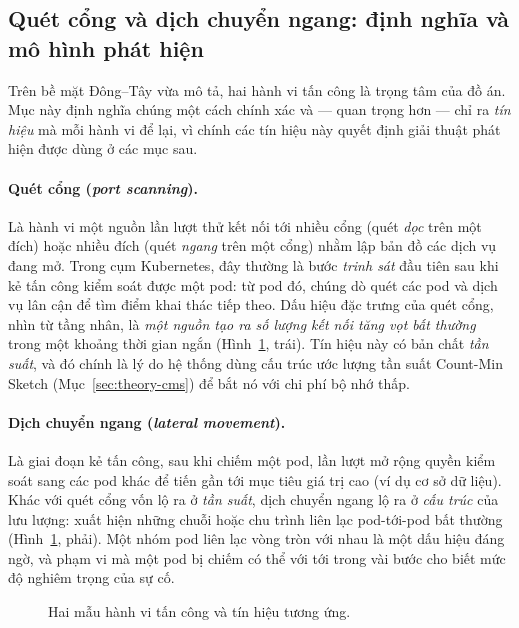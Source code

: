\subsection{Quét cổng và dịch chuyển ngang: định nghĩa và mô hình phát hiện}
\label{subsec:threat-defs}

Trên bề mặt Đông--Tây vừa mô tả, hai hành vi tấn công là trọng tâm của đồ án. Mục này
định nghĩa chúng một cách chính xác và --- quan trọng hơn --- chỉ ra \emph{tín hiệu} mà
mỗi hành vi để lại, vì chính các tín hiệu này quyết định giải thuật phát hiện được dùng ở
các mục sau.

\paragraph{Quét cổng (\textit{port scanning}).} Là hành vi một nguồn lần lượt thử kết nối
tới nhiều cổng (quét \emph{dọc} trên một đích) hoặc nhiều đích (quét \emph{ngang} trên một
cổng) nhằm lập bản đồ các dịch vụ đang mở. Trong cụm Kubernetes, đây thường là bước
\emph{trinh sát} đầu tiên sau khi kẻ tấn công kiểm soát được một pod: từ pod đó, chúng dò
quét các pod và dịch vụ lân cận để tìm điểm khai thác tiếp theo. Dấu hiệu đặc trưng của
quét cổng, nhìn từ tầng nhân, là \emph{một nguồn tạo ra số lượng kết nối tăng vọt bất
thường} trong một khoảng thời gian ngắn (Hình~\ref{fig:threat-patterns}, trái). Tín hiệu
này có bản chất \emph{tần suất}, và đó chính là lý do hệ thống dùng cấu trúc ước lượng tần
suất Count-Min Sketch (Mục~\ref{sec:theory-cms}) để bắt nó với chi phí bộ nhớ thấp.

\paragraph{Dịch chuyển ngang (\textit{lateral movement}).} Là giai đoạn kẻ tấn công, sau
khi chiếm một pod, lần lượt mở rộng quyền kiểm soát sang các pod khác để tiến gần tới mục
tiêu giá trị cao (ví dụ cơ sở dữ liệu). Khác với quét cổng vốn lộ ra ở \emph{tần suất},
dịch chuyển ngang lộ ra ở \emph{cấu trúc} của lưu lượng: xuất hiện những chuỗi hoặc chu
trình liên lạc pod-tới-pod bất thường (Hình~\ref{fig:threat-patterns}, phải). Một nhóm pod
liên lạc vòng tròn với nhau là một dấu hiệu đáng ngờ, và phạm vi mà một pod bị chiếm có
thể với tới trong vài bước cho biết mức độ nghiêm trọng của sự cố.

\begin{figure}[H]
  \centering
  \resizebox{0.92\linewidth}{!}{}
  \caption{Hai mẫu hành vi tấn công và tín hiệu tương ứng.}
  \label{fig:threat-patterns}
\end{figure}

